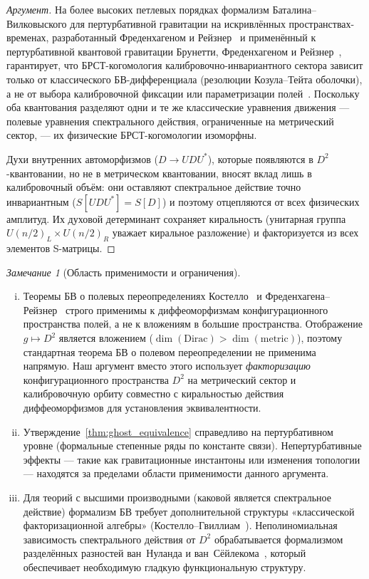 \documentclass[12pt,a4paper]{article}
\theoremstyle{definition}
\theoremstyle{remark}
\newtheorem{remark}[theorem]{Замечание}
\begin{document}
\begin{proof}[Аргумент]
На более высоких петлевых порядках формализм Баталина--Вилковыского для
пертурбативной гравитации на искривлённых пространствах-временах,
разработанный Фреденхагеном и
Рейзнер~\cite{Fredenhagen:2011bv,Fredenhagen:2012classical} и
применённый к пертурбативной квантовой гравитации Брунетти,
Фреденхагеном и Рейзнер~\cite{Brunetti:2013pqg}, гарантирует, что
БРСТ-когомология калибровочно-инвариантного сектора зависит только от
классического БВ-дифференциала (резолюции Козула--Тейта оболочки), а
не от выбора калибровочной фиксации или параметризации
полей~\cite{Rejzner:2016book}.  Поскольку оба квантования разделяют
одни и те же классические уравнения движения --- полевые уравнения
спектрального действия, ограниченные на метрический сектор, --- их
физические БРСТ-когомологии изоморфны.

Духи внутренних автоморфизмов ($D \to UDU^*$), которые появляются в
$D^2$-квантовании, но не в метрическом квантовании, вносят вклад лишь
в калибровочный объём: они оставляют спектральное действие точно
инвариантным ($S[UDU^*] = S[D]$) и поэтому отцепляются от всех
физических амплитуд.  Их духовой детерминант сохраняет киральность
(унитарная группа $U(n/2)_L \times U(n/2)_R$ уважает киральное
разложение) и факторизуется из всех элементов S-матрицы.
\end{proof}

\begin{remark}[Область применимости и ограничения]
\label{rem:scope}
\mbox{}
\begin{enumerate}[(i)]
  \item Теоремы БВ о полевых переопределениях
    Костелло~\cite{Costello:2011book} и
    Фреденхагена--Рейзнер~\cite{Fredenhagen:2011bv} строго применимы к
    диффеоморфизмам конфигурационного пространства полей, а не к
    вложениям в большие пространства.  Отображение $g \mapsto D^2$
    является вложением
    ($\dim(\mathrm{Dirac}) > \dim(\mathrm{metric})$), поэтому
    стандартная теорема БВ о полевом переопределении не применима
    напрямую.  Наш аргумент вместо этого использует
    \emph{факторизацию} конфигурационного пространства $D^2$ на
    метрический сектор и калибровочную орбиту совместно с
    киральностью действия диффеоморфизмов для установления
    эквивалентности.
  \item Утверждение~\ref{thm:ghost_equivalence} справедливо на
    пертурбативном уровне (формальные степенные ряды по
    константе связи).  Непертурбативные эффекты --- такие как
    гравитационные инстантоны или изменения топологии --- находятся
    за пределами области применимости данного аргумента.
  \item Для теорий с высшими производными (каковой является
    спектральное действие) формализм БВ требует дополнительной
    структуры «классической факторизационной алгебры»
    (Костелло--Гвиллиам~\cite{Costello:2017fact1, Costello:2021fact2}).
    Неполиномиальная зависимость спектрального действия от $D^2$
    обрабатывается формализмом разделённых разностей
    ван~Нуланда и ван~Сёйлекома~\cite{vanNuland:2021oneloop}, который
    обеспечивает необходимую гладкую функциональную структуру.
\end{enumerate}
\end{remark}
\end{document}
